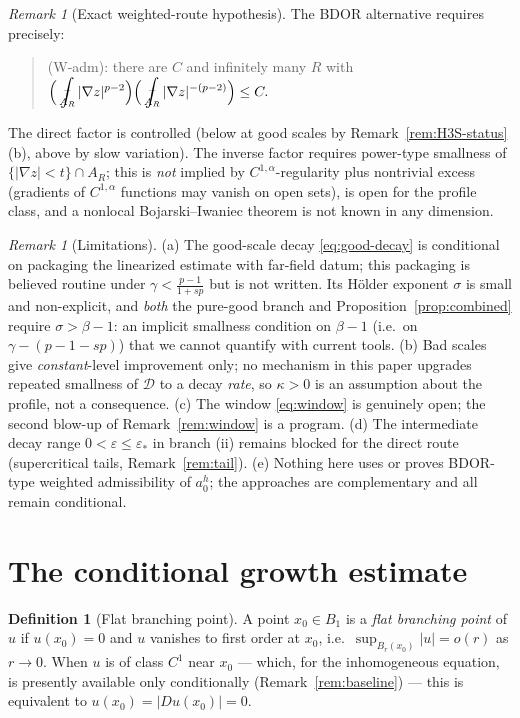 \documentclass[11pt]{amsart}
\theoremstyle{plain}
\theoremstyle{definition}
\newtheorem{definition}[theorem]{Definition}
\theoremstyle{remark}
\newtheorem{remark}[theorem]{Remark}
\newcommand{\al}{\alpha}
\newcommand{\fint}{\mathop{\ooalign{$\displaystyle\int$\cr\hidewidth\raise.5ex\hbox{$\scriptstyle-$}\hidewidth}}}
\begin{document}
\begin{remark}[Exact weighted-route hypothesis]\label{rem:wadm}
The BDOR alternative requires precisely:
\begin{quote}
\textnormal{(W-adm)}: there are $C$ and infinitely many $R$ with
$\displaystyle\Big(\fint_{A_R}|\nabla z|^{p-2}\Big)
\Big(\fint_{A_R}|\nabla z|^{-(p-2)}\Big)\le C .$
\end{quote}
The direct factor is controlled \textnormal{(}below at good scales by
Remark~\ref{rem:H3S-status}(b), above by slow variation\textnormal{)}.
The inverse factor requires power-type smallness of
$\{|\nabla z|<t\}\cap A_R$; this is \emph{not} implied by
$C^{1,\al}$-regularity plus nontrivial excess \textnormal{(}gradients of
$C^{1,\al}$ functions may vanish on open sets\textnormal{)}, is open for
the profile class, and a nonlocal Bojarski--Iwaniec theorem is not known
in any dimension.
\end{remark}

\begin{remark}[Limitations]\label{rem:dichotomy-limits}
\textnormal{(a)} The good-scale decay \eqref{eq:good-decay} is conditional
on packaging the \cite[\S7]{GJS} linearized estimate with far-field datum;
this packaging is believed routine under $\gamma<\frac{p-1}{1+sp}$ but is
not written. Its H\"older exponent $\sigma$ is small and non-explicit, and
\emph{both} the pure-good branch and Proposition~\ref{prop:combined}
require $\sigma>\beta-1$: an implicit smallness condition on
$\beta-1$ \textnormal{(}i.e.\ on $\gamma-(p-1-sp)$\textnormal{)} that we
cannot quantify with current tools. \textnormal{(b)} Bad scales give
\emph{constant}-level improvement only; no mechanism in this paper
upgrades repeated smallness of $\mathcal D$ to a decay \emph{rate}, so
$\kappa>0$ is an assumption about the profile, not a consequence.
\textnormal{(c)} The window \eqref{eq:window} is genuinely open; the
second blow-up of Remark~\ref{rem:window} is a program.
\textnormal{(d)} The intermediate decay range
$0<\varepsilon\le\varepsilon_*$ in branch (ii) remains blocked for the
direct route \textnormal{(}supercritical tails,
Remark~\ref{rem:tail}\textnormal{)}. \textnormal{(e)} Nothing here uses or
proves BDOR-type weighted admissibility of $a_0^h$; the approaches are
complementary and all remain conditional.
\end{remark}

\section{The conditional growth estimate}\label{sec:growth}
\begin{definition}[Flat branching point]\label{def:branch}
A point $x_0\in B_1$ is a \emph{flat branching point} of $u$ if $u(x_0)=0$ and
$u$ vanishes to first order at $x_0$, i.e.\ $\sup_{B_r(x_0)}|u|=o(r)$ as
$r\to0$. When $u$ is of class $C^1$ near $x_0$ --- which, for the inhomogeneous
equation, is presently available only conditionally (Remark~\ref{rem:baseline})
--- this is equivalent to $u(x_0)=|Du(x_0)|=0$.
\end{definition}
\end{document}

